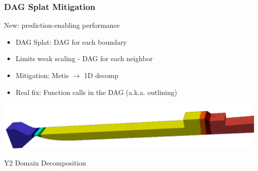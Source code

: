 \begin{frame}\frametitle{DAG Splat Mitigation}
\begin{minipage}[t][0.4\textheight][t]{\textwidth}
\begin{center}
New: prediction-enabling performance
\end{center}
\begin{multicols}{2}
\begin{itemize}
\item DAG Splat: DAG for each boundary
\item Limits weak scaling - DAG for each neighbor
\columnbreak
\item Mitigation: Metis $\to$ 1D decomp
\item Real fix: Function calls in the DAG (a.k.a. outlining)   %
\end{itemize}
\end{multicols}
\end{minipage}\vfill
\begin{minipage}[t][0.4\textheight][t]{\textwidth}
\centering
\includegraphics[width=.9\textwidth]{Figures/mtc/1dpartshiny.png}\\
\begin{center}
Y2 Domain Decomposition
\end{center}
\end{minipage}
\end{frame}

